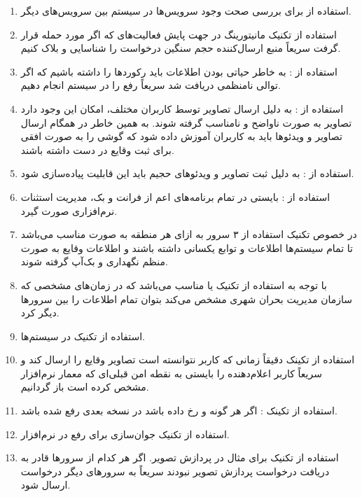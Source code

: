 \begin{enumerate}
    \item استفاده از  برای بررسی صحت وجود سرویس‌ها در سیستم بین
    سرویس‌های دیگر.
    \item استفاده از تکنیک مانیتورینگ در جهت پایش فعالیت‌های  که اگر
    مورد حمله  قرار گرفت سریعاً منبع ارسال‌کننده حجم سنگین درخواست را
    شناسایی و بلاک کنیم.
    \item استفاده از : به خاطر حیاتی بودن اطلاعات باید
     رکورد‌ها را داشته باشیم که اگر توالی نامنظمی دریافت شد سریعاً
    رفع  را در سیستم انجام دهیم.
    \item استفاده از : به دلیل ارسال تصاویر توسط
    کاربران مختلف، امکان این وجود دارد تصاویر به صورت ناواضح و نامناسب گرفته
    شوند. به همین خاطر در همگام ارسال تصاویر و ویدئو‌ها باید به کاربران آموزش
    داده شود که گوشی را به صورت افقی برای ثبت وقایع در دست داشته باشند.
    \item استفاده از : به دلیل ثبت تصاویر و ویدئو‌های حجیم باید این
    قابلیت پیاده‌سازی شود.
    \item استفاده از : بایستی در تمام
    برنامه‌های اعم از فرانت و بک، مدیریت استثنات نرم‌افزاری صورت گیرد.
    \item در خصوص تکنیک  استفاده از ۳ سرور به ازای هر منطقه به صورت
     مناسب می‌باشد تا تمام سیستم‌ها اطلاعات و توابع یکسانی داشته
    باشند و اطلاعات وقایع به صورت منظم نگهداری و بک‌آپ گرفته شوند.
    \item با توجه به  استفاده از تکنیک  یا
     مناسب می‌باشد که در زمان‌های مشخصی که سازمان مدیریت
    بحران شهری مشخص می‌کند بتوان تمام اطلاعات را بین سرور‌ها دیگر  کرد.
    \item استفاده از تکنیک  در  سیستم‌ها.
    \item استفاده از تکینک  دقیقاً زمانی که کاربر نتوانسته است
    تصاویر وقایع را ارسال کند و سریعاً کاربر اعلام‌دهنده را بایستی به نقطه امن
    قبلی‌ای که معمار نرم‌افزار مشخص کرده است باز گردانیم.
    \item استفاده از تکینک : اگر هر گونه  و
     رخ داده باشد در نسخه بعدی رفع شده باشد.
    \item استفاده از تکنیک جوان‌سازی برای رفع  در نرم‌افزار.
    \item استفاده از تکنیک  برای مثال در پردازش تصویر. اگر هر کدام از
    سرور‌ها قادر به دریافت درخواست پردازش تصویر نبودند سریعاً به سرور‌های دیگر
    درخواست ارسال شود.
\end{enumerate}

